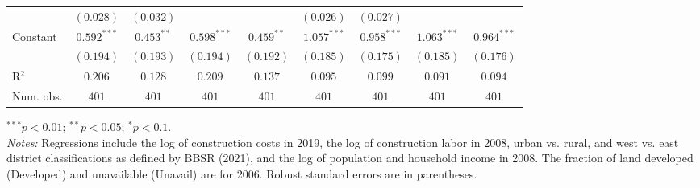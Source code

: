 \begin{table}[H]
\begin{center}
\begin{footnotesize}
\begin{threeparttable}
\begin{tabular}{l@{} c@{} c@{} c@{} c@{} c@{} c@{} c@{} c@{}}
                                      & $(0.028)$      & $(0.032)$      &                &                & $(0.026)$      & $(0.027)$      &                &                \\
Constant                              & $0.592^{***}$  & $0.453^{**}$   & $0.598^{***}$  & $0.459^{**}$   & $1.057^{***}$  & $0.958^{***}$  & $1.063^{***}$  & $0.964^{***}$  \\
                                      & $(0.194)$      & $(0.193)$      & $(0.194)$      & $(0.192)$      & $(0.185)$      & $(0.175)$      & $(0.185)$      & $(0.176)$      \\
\midrule
R$^2$                                 & $0.206$        & $0.128$        & $0.209$        & $0.137$        & $0.095$        & $0.099$        & $0.091$        & $0.094$        \\
Num. obs.                             & $401$          & $401$          & $401$          & $401$          & $401$          & $401$          & $401$          & $401$          \\
\bottomrule
\end{tabular}
\begin{tablenotes}[flushleft]
\tiny{\item $^{***}p<0.01$; $^{**}p<0.05$; $^{*}p<0.1$. \\ \textit{Notes:} Regressions include the log of construction costs in 2019, the log of construction labor in 2008, urban vs. rural, and west vs. east district classifications as defined by BBSR (2021), and the log of population and household income in 2008. The fraction of land developed (Developed) and unavailable (Unavail) are for 2006. Robust standard errors are in parentheses.}
\end{tablenotes}
\end{threeparttable}
\end{footnotesize}
\label{tab:iv-main-results-checked}
\end{center}
\end{table}

